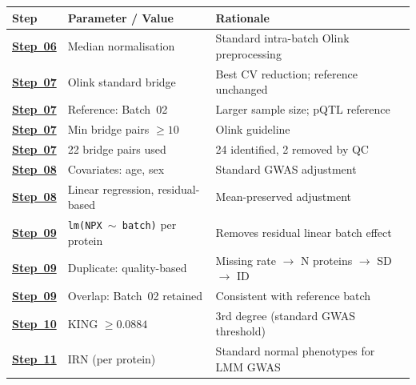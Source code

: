 \documentclass[11pt,a4paper]{article}
\begin{document}
{\footnotesize
\renewcommand{\arraystretch}{1.1}
\begin{longtable}{p{2.2cm}p{4.5cm}p{5cm}}
\toprule
\textbf{Step} & \textbf{Parameter / Value} & \textbf{Rationale} \\
\midrule
\textbf{\href{https://github.com/FINNGEN/FinnGen3-proteomics-pipeline#pipeline-steps}{Step~06}} & Median normalisation
  & Standard intra-batch Olink preprocessing \\
\textbf{\href{https://github.com/FINNGEN/FinnGen3-proteomics-pipeline#pipeline-steps}{Step~07}} & Olink standard bridge
  & Best CV reduction; reference unchanged \\
\textbf{\href{https://github.com/FINNGEN/FinnGen3-proteomics-pipeline#pipeline-steps}{Step~07}} & Reference: Batch~02
  & Larger sample size; pQTL reference \\
\textbf{\href{https://github.com/FINNGEN/FinnGen3-proteomics-pipeline#pipeline-steps}{Step~07}} & Min bridge pairs $\geq 10$
  & Olink guideline \\
\textbf{\href{https://github.com/FINNGEN/FinnGen3-proteomics-pipeline#pipeline-steps}{Step~07}} & 22 bridge pairs used
  & 24 identified, 2 removed by QC \\
\textbf{\href{https://github.com/FINNGEN/FinnGen3-proteomics-pipeline#pipeline-steps}{Step~08}} & Covariates: age, sex
  & Standard GWAS adjustment \\
\textbf{\href{https://github.com/FINNGEN/FinnGen3-proteomics-pipeline#pipeline-steps}{Step~08}} & Linear regression, residual-based
  & Mean-preserved adjustment \\
\textbf{\href{https://github.com/FINNGEN/FinnGen3-proteomics-pipeline#pipeline-steps}{Step~09}} & \texttt{lm(NPX $\sim$ batch)} per protein
  & Removes residual linear batch effect \\
\textbf{\href{https://github.com/FINNGEN/FinnGen3-proteomics-pipeline#pipeline-steps}{Step~09}} & Duplicate: quality-based
  & Missing rate $\to$ N proteins $\to$ SD $\to$ ID \\
\textbf{\href{https://github.com/FINNGEN/FinnGen3-proteomics-pipeline#pipeline-steps}{Step~09}} & Overlap: Batch~02 retained
  & Consistent with reference batch \\
\textbf{\href{https://github.com/FINNGEN/FinnGen3-proteomics-pipeline#pipeline-steps}{Step~10}} & KING $\geq 0.0884$
  & 3rd degree (standard GWAS threshold) \\
\textbf{\href{https://github.com/FINNGEN/FinnGen3-proteomics-pipeline#pipeline-steps}{Step~11}} & IRN (per protein)
  & Standard normal phenotypes for LMM GWAS \\
\bottomrule
\end{longtable}
\renewcommand{\arraystretch}{1.0}
}
\end{document}
